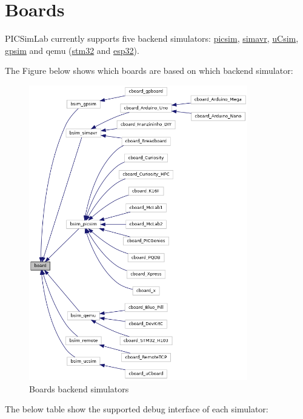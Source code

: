 \chapter{Boards} \hypertarget{def:boards}{}

PICSimLab currently supports five backend simulators:
\hyperlink{def:PICSim}{picsim},  
\hyperlink{def:simavr}{simavr}, 
\hyperlink{def:ucsim}{uCsim}, 
\hyperlink{def:gpsim}{gpsim} and 
qemu (\hyperlink{def:qemu-stm32}{stm32} and \hyperlink{def:qemu-esp32}{esp32}).

The Figure below shows which boards are based on which backend simulator:

\begin{figure}[H] 
\center
\includegraphics[width=0.85\textwidth]{img/boards.png} 
\caption{Boards backend simulators}
\end{figure} 

The below table show the supported debug interface of each simulator:

